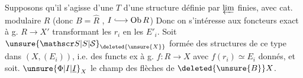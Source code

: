 Supposons qu'il s'agisse d'une $T$ d'une
structure définie par $\varprojlim$ finies, avec cat. modulaire
$R$ (donc $B=\widehat R$ \unsure{$\}$}, $I\lhook\joinrel\longrightarrow\mathrm{Ob}\,R$) Donc on
s'intéresse aux foncteurs exact à g.
$R\longrightarrow X'$ transformant les $r_i$ en les $E'_i$.
Soit $\unsure{\mathscr S|S|\mathcal S}_{\deleted{\unsure{X}}}$  formée des structures
de ce type dans $(X,(E_i))$,  i.e. des functs ex
à g. $f:R\longrightarrow X$ avec $f(r_i)\simeq E_i$ donnés, et
soit. $\unsure{\Phi|I|\underline I}_X$ le champ  des flèches de $\deleted{\unsure{B}}X$.
